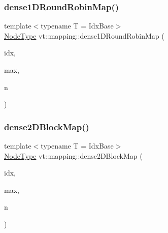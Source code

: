 \subsubsection{\texorpdfstring{dense1\+D\+Round\+Robin\+Map()}{dense1DRoundRobinMap()}}
{\footnotesize\ttfamily template$<$typename T  = Idx\+Base$>$ \\
\hyperlink{namespacevt_a866da9d0efc19c0a1ce79e9e492f47e2}{Node\+Type} vt\+::mapping\+::dense1\+D\+Round\+Robin\+Map (\begin{DoxyParamCaption}\item[{\hyperlink{namespacevt_1_1mapping_a8b576cf2f31069778e4951f64bccafd8}{Idx1\+D\+Ptr}$<$ T $>$}]{idx,  }\item[{\hyperlink{namespacevt_1_1mapping_a8b576cf2f31069778e4951f64bccafd8}{Idx1\+D\+Ptr}$<$ T $>$}]{max,  }\item[{\hyperlink{namespacevt_a866da9d0efc19c0a1ce79e9e492f47e2}{Node\+Type}}]{n }\end{DoxyParamCaption})}

\mbox{\label{namespacevt_1_1mapping_aca20bcd20c24f4a43e217ca63bf5812c}} 
\subsubsection{\texorpdfstring{dense2\+D\+Block\+Map()}{dense2DBlockMap()}}
{\footnotesize\ttfamily template$<$typename T  = Idx\+Base$>$ \\
\hyperlink{namespacevt_a866da9d0efc19c0a1ce79e9e492f47e2}{Node\+Type} vt\+::mapping\+::dense2\+D\+Block\+Map (\begin{DoxyParamCaption}\item[{\hyperlink{namespacevt_1_1mapping_a6832cbb1361fe72fd7ec730e7b7773b3}{Idx2\+D\+Ptr}$<$ T $>$}]{idx,  }\item[{\hyperlink{namespacevt_1_1mapping_a6832cbb1361fe72fd7ec730e7b7773b3}{Idx2\+D\+Ptr}$<$ T $>$}]{max,  }\item[{\hyperlink{namespacevt_a866da9d0efc19c0a1ce79e9e492f47e2}{Node\+Type}}]{n }\end{DoxyParamCaption})}

\mbox{\label{namespacevt_1_1mapping_ac606a5886c93a4dbb05dfead285c30c6}} 
